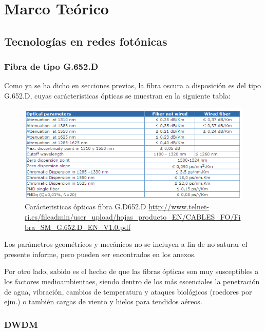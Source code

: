 
\section{Marco Te\'orico}
\label{sec:marcoteorico}

\subsection{Tecnolog\'ias en redes fot\'onicas}
\label{sec:redfotonica}

\subsubsection{Fibra de tipo G.652.D}

Como ya se ha dicho en secciones previas, la fibra oscura a disposición es del tipo G.652.D, cuyas carácteristicas ópticas se muestran en la siguiente tabla: 

\begin{figure}[H]
  \centering
  \includegraphics[scale=1]{Imagenes/Fibra.png}
  \caption{Carácteristicas ópticas fibra G.D652.D \url{http://www.telnet-ri.es/fileadmin/user_upload/hojas_producto_EN/CABLES_FO/Fibra_SM_G.652.D_EN_V1.0.pdf}}
  \label{fig:dwdmchannels}
\end{figure}

Los parámetros geométricos y mecánicos no se incluyen a fin de no saturar el presente informe, pero pueden ser encontrados en los anexos.
  
Por otro lado, sabido es el hecho de que las fibras ópticas son muy susceptibles a los factores medioambientaes, siendo dentro de los más escenciales la penetración de agua, vibración, cambios de temperatura y ataques biológicos (roedores por ejm.) o también cargas de viento y hielos para tendidos aéreos. 

\subsubsection{DWDM}
\label{sec:dwdm}

